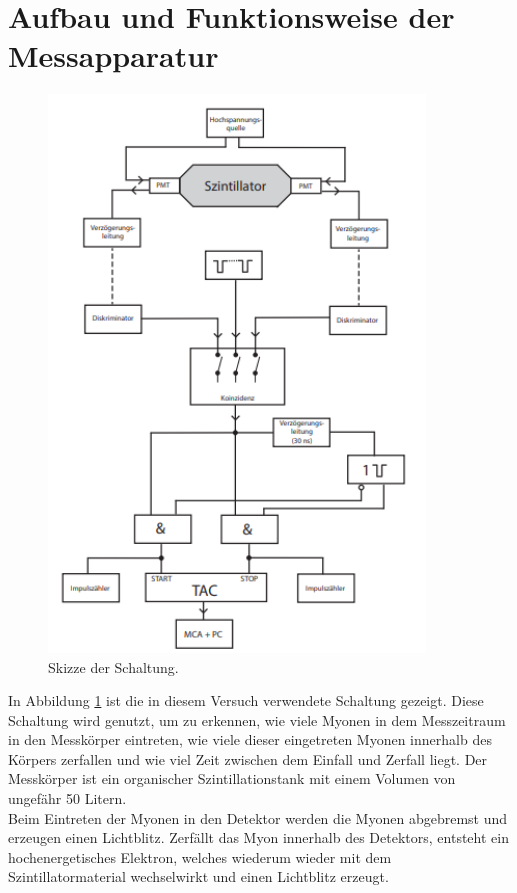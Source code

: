 \newpage
\section{Aufbau und Funktionsweise der Messapparatur}

	\begin{figure}
		\includegraphics[width=10cm]{latex/images/Aufbau.png}
		\caption{Skizze der Schaltung\protect \cite{V01}.}
		\label{fig:Aufb}
	\end{figure}
    In Abbildung \ref{fig:Aufb} ist die in diesem Versuch verwendete Schaltung gezeigt.
    Diese Schaltung wird genutzt, um zu erkennen, wie viele Myonen in dem Messzeitraum in den Messkörper eintreten, wie viele dieser eingetreten Myonen innerhalb des Körpers zerfallen und wie viel Zeit zwischen dem Einfall und Zerfall liegt.
    Der Messkörper ist ein organischer Szintillationstank mit einem Volumen von ungefähr 50 Litern.\\
    Beim Eintreten der Myonen in den Detektor werden die Myonen abgebremst und erzeugen einen Lichtblitz.
    Zerfällt das Myon innerhalb des Detektors, entsteht ein hochenergetisches Elektron, welches wiederum wieder mit dem Szintillatormaterial wechselwirkt und einen Lichtblitz erzeugt.
